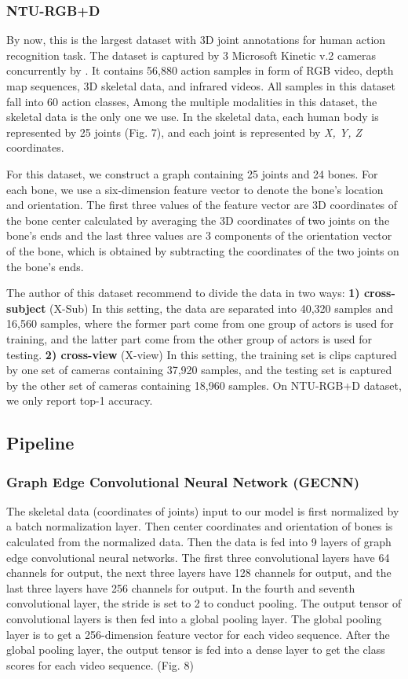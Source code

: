 \documentclass[a4paper,11pt]{article}
\begin{document}
\subsubsection{NTU-RGB+D}
By now, this is the largest dataset with 3D joint annotations for human action recognition task. The dataset is captured by 3 Microsoft Kinetic v.2 cameras concurrently by \cite{shahroudy2016ntu}. It contains 56,880 action samples in form of RGB video, depth map sequences, 3D skeletal data, and infrared videos. All samples in this dataset fall into 60 action classes, Among the multiple modalities in this dataset, the skeletal data is the only one we use. In the skeletal data, each human body is represented by 25 joints (Fig. 7), and each joint is represented by {\it X, Y, Z} coordinates.




For this dataset, we construct a graph containing 25 joints and 24 bones. For each bone, we use a six-dimension feature vector to denote the bone's location and orientation. The first three values of the feature vector are 3D coordinates of the bone center calculated by averaging the 3D coordinates of two joints on the bone's ends and the last three values are 3 components of the orientation vector of the bone, which is obtained by subtracting the coordinates of the two joints on the bone's ends.

The author of this dataset recommend to divide the data in two ways:
{\bf 1) cross-subject} (X-Sub)
In this setting, the data are separated into 40,320 samples and 16,560 samples, where the former part come from one group of actors is used for training, and the latter part come from the other group of actors is used for testing.
{\bf 2) cross-view} (X-view) In this setting, the training set is clips captured by one set of cameras containing 37,920 samples, and the testing set is captured by the other set of cameras containing 18,960 samples. 
On NTU-RGB+D dataset, we only report top-1 accuracy.


\subsection{Pipeline}
\subsubsection{Graph Edge Convolutional Neural Network (GECNN)}
The skeletal data (coordinates of joints) input to our model is first normalized by a batch normalization layer. Then center coordinates and orientation of bones is calculated from the normalized data. Then the data is fed into 9 layers of graph edge convolutional neural networks. The first three convolutional layers have 64 channels for output, the next three layers have 128 channels for output, and the last three layers have 256 channels for output. In the fourth and seventh convolutional layer, the stride is set to 2 to conduct pooling. The output tensor of convolutional layers is then fed into a global pooling layer. The global pooling layer is to get a 256-dimension feature vector for each video sequence. After the global pooling layer, the output tensor is fed into a dense layer to get the class scores for each video sequence. (Fig. 8)
\end{document}
